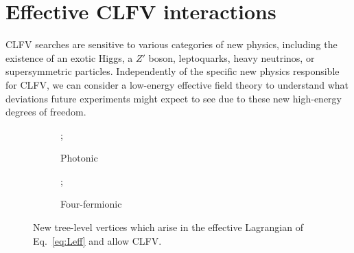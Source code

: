 




\section{Effective CLFV interactions}
CLFV searches are sensitive to various categories of new physics, including the
existence of an exotic Higgs, a $Z'$ boson, leptoquarks, heavy neutrinos, or
supersymmetric particles. Independently of the specific new physics responsible
for CLFV, we can consider a low-energy effective field theory to understand what
deviations future experiments might expect to see due to these new high-energy
degrees of freedom. 

\begin{figure}
    \centering
    \begin{subfigure}[b]{0.3\textwidth}
        \centering
        ;
        \caption{Photonic}
    \end{subfigure}
    \hspace{1cm}
    \begin{subfigure}[b]{0.3\textwidth}
        \centering
        ;
        \caption{Four-fermionic}
    \end{subfigure}
    \caption{New tree-level vertices which arise in the effective Lagrangian
    of Eq.~\ref{eq:Leff} and allow CLFV.}
    \label{fig:tree_lvl_clfv}
\end{figure}


